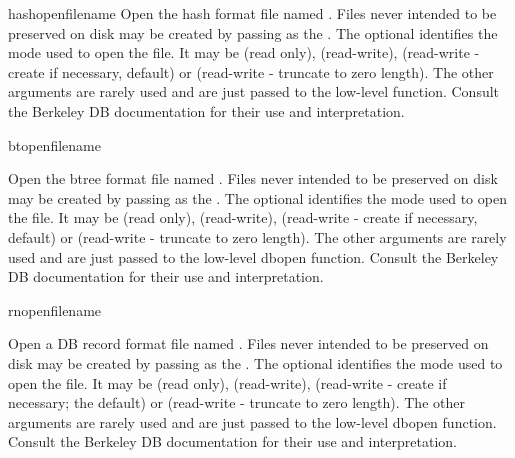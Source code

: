 \begin{funcdesc}{hashopen}{filename}
Open the hash format file named .  Files never intended
to be preserved on disk may be created by passing  as the 
.  The optional
 identifies the mode used to open the file.  It may be
 (read only),  (read-write),
 (read-write - create if necessary, default) or
 (read-write - truncate to zero length).  The other
arguments are rarely used and are just passed to the low-level
 function.  Consult the Berkeley DB documentation
for their use and interpretation.
\end{funcdesc}

\begin{funcdesc}{btopen}{filename}

Open the btree format file named .  Files never intended 
to be preserved on disk may be created by passing  as the 
.  The optional
 identifies the mode used to open the file.  It may be
 (read only),  (read-write),
 (read-write - create if necessary, default) or
 (read-write - truncate to zero length).  The other
arguments are rarely used and are just passed to the low-level dbopen
function.  Consult the Berkeley DB documentation for their use and
interpretation.
\end{funcdesc}

\begin{funcdesc}{rnopen}{filename}

Open a DB record format file named .  Files never intended 
to be preserved on disk may be created by passing  as the 
.  The optional
 identifies the mode used to open the file.  It may be
 (read only),  (read-write),
 (read-write - create if necessary; the default) or
 (read-write - truncate to zero length).  The other
arguments are rarely used and are just passed to the low-level dbopen
function.  Consult the Berkeley DB documentation for their use and
interpretation.
\end{funcdesc}


